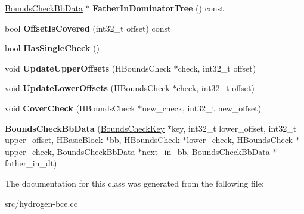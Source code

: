 \begin{DoxyCompactItemize}
\item 
\hypertarget{classv8_1_1internal_1_1_bounds_check_bb_data_a7b30a1ec519b9c7eb193f4d62ace7134}{}\hyperlink{classv8_1_1internal_1_1_bounds_check_bb_data}{Bounds\+Check\+Bb\+Data} $\ast$ {\bfseries Father\+In\+Dominator\+Tree} () const \label{classv8_1_1internal_1_1_bounds_check_bb_data_a7b30a1ec519b9c7eb193f4d62ace7134}

\item 
\hypertarget{classv8_1_1internal_1_1_bounds_check_bb_data_a31b01a11fc7dc91f9f730cd846964f69}{}bool {\bfseries Offset\+Is\+Covered} (int32\+\_\+t offset) const \label{classv8_1_1internal_1_1_bounds_check_bb_data_a31b01a11fc7dc91f9f730cd846964f69}

\item 
\hypertarget{classv8_1_1internal_1_1_bounds_check_bb_data_a60a84a1534069c8392d4f4d2c1a10661}{}bool {\bfseries Has\+Single\+Check} ()\label{classv8_1_1internal_1_1_bounds_check_bb_data_a60a84a1534069c8392d4f4d2c1a10661}

\item 
\hypertarget{classv8_1_1internal_1_1_bounds_check_bb_data_ab8e202b743f598acfc51cedfed93f825}{}void {\bfseries Update\+Upper\+Offsets} (H\+Bounds\+Check $\ast$check, int32\+\_\+t offset)\label{classv8_1_1internal_1_1_bounds_check_bb_data_ab8e202b743f598acfc51cedfed93f825}

\item 
\hypertarget{classv8_1_1internal_1_1_bounds_check_bb_data_a1294e4625db8756b987d83191dfda9ea}{}void {\bfseries Update\+Lower\+Offsets} (H\+Bounds\+Check $\ast$check, int32\+\_\+t offset)\label{classv8_1_1internal_1_1_bounds_check_bb_data_a1294e4625db8756b987d83191dfda9ea}

\item 
\hypertarget{classv8_1_1internal_1_1_bounds_check_bb_data_a08bbd685e9d4b2268114719cdea4d6d3}{}void {\bfseries Cover\+Check} (H\+Bounds\+Check $\ast$new\+\_\+check, int32\+\_\+t new\+\_\+offset)\label{classv8_1_1internal_1_1_bounds_check_bb_data_a08bbd685e9d4b2268114719cdea4d6d3}

\item 
\hypertarget{classv8_1_1internal_1_1_bounds_check_bb_data_a80784e614dd0f96c7dd278e50346c960}{}{\bfseries Bounds\+Check\+Bb\+Data} (\hyperlink{classv8_1_1internal_1_1_bounds_check_key}{Bounds\+Check\+Key} $\ast$key, int32\+\_\+t lower\+\_\+offset, int32\+\_\+t upper\+\_\+offset, H\+Basic\+Block $\ast$bb, H\+Bounds\+Check $\ast$lower\+\_\+check, H\+Bounds\+Check $\ast$upper\+\_\+check, \hyperlink{classv8_1_1internal_1_1_bounds_check_bb_data}{Bounds\+Check\+Bb\+Data} $\ast$next\+\_\+in\+\_\+bb, \hyperlink{classv8_1_1internal_1_1_bounds_check_bb_data}{Bounds\+Check\+Bb\+Data} $\ast$father\+\_\+in\+\_\+dt)\label{classv8_1_1internal_1_1_bounds_check_bb_data_a80784e614dd0f96c7dd278e50346c960}

\end{DoxyCompactItemize}


The documentation for this class was generated from the following file\+:\begin{DoxyCompactItemize}
\item 
src/hydrogen-\/bce.\+cc\end{DoxyCompactItemize}
